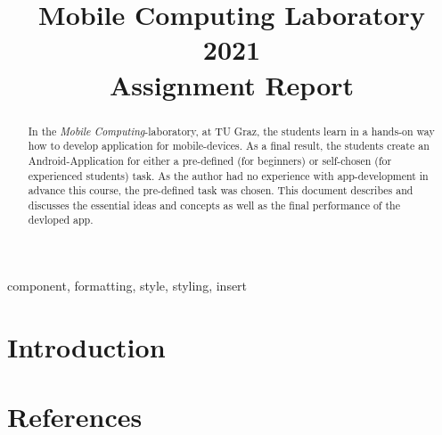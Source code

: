 \documentclass[journal]{IEEEtran}
\begin{document}
\title{Mobile Computing Laboratory 2021\\
Assignment Report}

\author{
}

\maketitle

\begin{abstract}
    In the \textit{Mobile Computing}-laboratory, at TU Graz, the students
    learn in a hands-on way how to develop application for mobile-devices. 
    As a final result, the students create an Android-Application for either a pre-defined (for beginners)
    or self-chosen (for experienced students) task. 
    As the author had no experience with app-development in advance this course, the pre-defined task was chosen.\newline
    This document describes and discusses the essential ideas and concepts as well as the final performance of the devloped app. 
\end{abstract}

\begin{IEEEkeywords}
component, formatting, style, styling, insert
\end{IEEEkeywords}

\section{Introduction}

\section*{References}
\printbibliography
\end{document}
